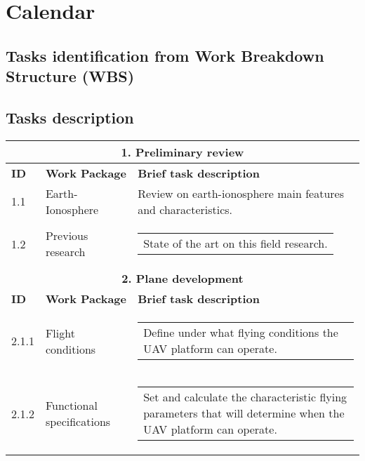 \chapter{Calendar}
\section{Tasks identification from Work Breakdown Structure (WBS)}

\section{Tasks description}
\newcommand{\ra}[1]{\renewcommand{\arraystretch}{#1}}
\ra{1.3}
\begin{longtable}[htb]{@{}lll@{}}\toprule[3pt]
	\multicolumn{3}{c}{\textbf{\large 1. Preliminary review} }\\ \midrule[2pt]
		\textbf{ID} & \textbf{Work Package} &\textbf{Brief task description}\\ \midrule[1pt]
		1.1& Earth-Ionosphere& Review on earth-ionosphere main features and characteristics.\\
		1.2& Previous research& \begin{tabular}[c]{@{}l@{}}
			\begin{minipage}[t]{0.7\linewidth}
				State of the art on this field research.
			\end{minipage}
		\end{tabular} \\
	\midrule[2pt]
	\multicolumn{3}{c}{\textbf{\large 2. Plane development} }\\ \midrule[2pt]
	\textbf{ID} & \textbf{Work Package} &\textbf{Brief task description}\\ \midrule[1pt]
	2.1.1& Flight conditions& \begin{tabular}[c]{@{}l@{}}
		\begin{minipage}[t]{0.7\linewidth}
			Define under what flying conditions the UAV platform can operate. 
		\end{minipage}
	\end{tabular} \\
	2.1.2& Functional specifications& \begin{tabular}[c]{@{}l@{}}
		\begin{minipage}[t]{0.7\linewidth}
			Set and calculate the characteristic flying parameters that will determine when the UAV platform can operate. 
		\end{minipage}
	\end{tabular} \\


\end{longtable}
